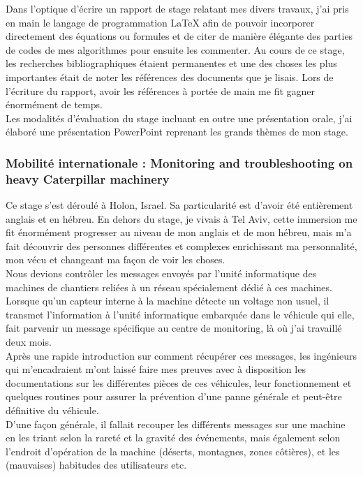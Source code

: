 \documentclass[french]{article}
\newcommand{\sbrown}{\color{sbrown}}
\begin{document}
   Dans l'optique d'écrire un rapport de stage relatant mes divers travaux, j'ai pris en main le langage de programmation \LaTeX $ $ afin de pouvoir incorporer directement des équations ou formules et de citer de manière élégante des parties de codes de mes algorithmes pour ensuite les commenter. Au cours de ce stage, les recherches bibliographiques étaient permanentes et une des choses les plus importantes était de noter les références des documents que je lisais. Lors de l'écriture du rapport, avoir les références à portée de main me fit gagner énormément de temps.   
\\
   Les modalités d'évaluation  du stage incluant en outre une présentation orale, j'ai élaboré une présentation PowerPoint reprenant les grands thèmes de mon stage. \\
   
  \subsubsection*{\sbrown  Mobilité internationale : Monitoring and troubleshooting on heavy Caterpillar machinery}
  Ce stage s'est déroulé à Holon, Israel. Sa particularité est d'avoir été entièrement anglais et en hébreu. En dehors du stage, je vivais à Tel Aviv, cette immersion me fit énormément progresser au niveau de mon anglais et de mon hébreu, mais m'a fait découvrir des personnes différentes et complexes enrichissant ma personnalité, mon vécu et changeant ma façon de voir les choses.\\
Nous devions contrôler les messages envoyés par l'unité informatique des machines de chantiers reliées à un réseau spécialement dédié à ces machines. Lorsque qu'un capteur interne à la machine détecte un voltage non usuel, il transmet l'information à l'unité informatique embarquée dans le véhicule qui elle, fait parvenir un message spécifique au centre de monitoring, là où j'ai travaillé deux mois. \\
Après une rapide introduction sur comment récupérer ces messages, les ingénieurs qui m'encadraient m'ont laissé faire mes preuves avec à disposition les documentations sur les différentes pièces de ces véhicules, leur fonctionnement et quelques routines pour assurer la prévention d'une panne générale et peut-être définitive du véhicule.\\

  D'une façon générale, il fallait recouper les différents messages sur une machine en les triant selon la rareté et la gravité des événements, mais également selon l'endroit d'opération de la machine (déserts, montagnes, zones côtières), et les (mauvaises) habitudes des utilisateurs etc.\\
  
\end{document}
